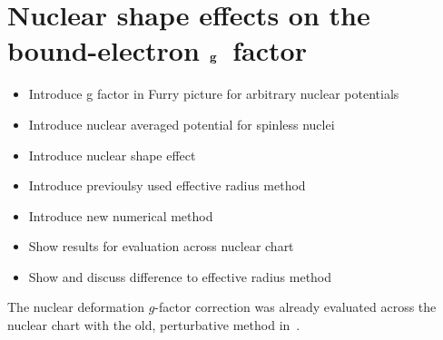 \chapter{Nuclear shape effects on the bound-electron $\bf{g}$~factor}
\label{ch:nucl_def}


\begin{itemize}
\item Introduce g factor in Furry picture for arbitrary nuclear potentials
\item Introduce nuclear averaged potential for spinless nuclei
\item Introduce nuclear shape effect
\item Introduce previoulsy used effective radius method
\item Introduce new numerical method 
\item Show results for evaluation across nuclear chart
\item Show and discuss difference to effective radius method
\end{itemize}
The nuclear deformation $g$-factor correction was already evaluated across the nuclear chart with the old, perturbative method in~\cite{michel2015}.\\

